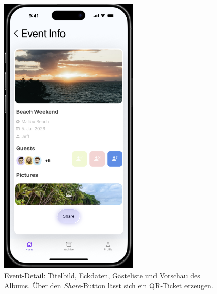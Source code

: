 \documentclass[11pt,a4paper]{article}
\begin{document}
\begin{figure}[h]
  \centering
  \includegraphics[width=0.6\textwidth]{image-6.png}
  \caption{Event‑Detail: Titelbild, Eckdaten, Gästeliste und Vorschau des Albums. Über den \emph{Share}-Button lässt sich ein QR‑Ticket erzeugen.}
  \label{fig:eventinfo}
\end{figure}
\end{document}
